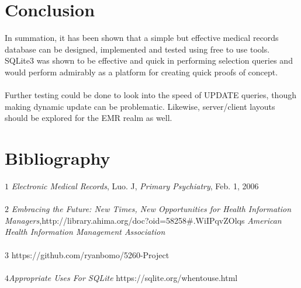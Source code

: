 \documentclass[12pt]{article}
\theoremstyle{plain}
\theoremstyle{definition}
\begin{document}
\section*{Conclusion}
In summation, it has been shown that a simple but effective medical records database can be designed, implemented and tested using free to use tools.  SQLite3 was shown to be effective and quick in performing selection queries and would perform admirably as a platform for creating quick proofs of concept.\\
\\
Further testing could be done to look into the speed of UPDATE queries, though making dynamic update can be problematic.  Likewise, server/client layouts should be explored for the EMR realm as well.
\pagebreak
\section*{Bibliography}
${1}$ \textit{Electronic Medical Records}, Luo. J, \textit{Primary Psychiatry}, Feb. 1, 2006
\\
\\
${2}$ \textit{Embracing the Future: New Times, New Opportunities for Health Information Managers},http://library.ahima.org/doc?oid=58258\#.WiIPqvZOlqs \textit{American Health Information Management Association}
\\
\\
${3}$ https://github.com/ryanbomo/5260-Project
\\
\\
${4}$\textit{Appropriate Uses For SQLite} https://sqlite.org/whentouse.html
\end{document}
